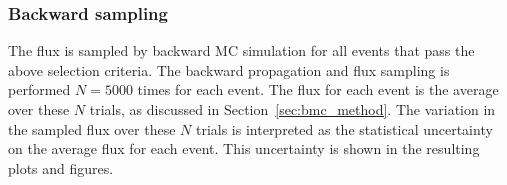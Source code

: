 \subsubsection{Backward sampling}
The flux is sampled by backward MC simulation for all events that pass the above
selection criteria. The backward propagation and flux sampling is performed
$N=5000$ times for each event. The flux for each event is the average over these
$N$ trials, as discussed in Section~\ref{sec:bmc_method}. The variation in the
sampled flux over these $N$ trials is interpreted as the statistical uncertainty
on the average flux for each event. This uncertainty is shown in the resulting
plots and figures.


